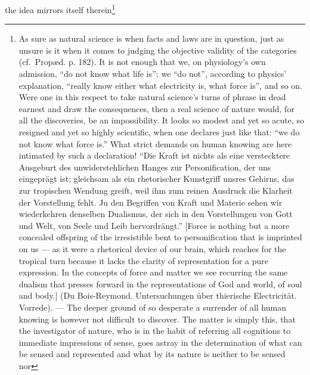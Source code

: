 \documentclass[12pt,a4paper]{book}
\begin{document}
the idea mirrors itself therein\footnote{As sure as natural science is when facts
and laws are in question, just as unsure is it when it comes to judging the
objective validity of the categories (cf.\ Propæd. p. 182).
It is not enough that we, on physiology's own admission, ``do not know what life
is''; we ``do not'', according to physics' explanation, ``really know either what
electricity is, what force is'', and so on. Were one in this respect to take
natural science's turns of phrase in dead earnest and draw the consequences, then
a real science of nature would, for all the discoveries, be an impossibility. It
looks so modest and yet so acute, so resigned and yet so highly scientific, when
one declares just like that: ``we do not know what force is.'' What strict demands
on human knowing are here intimated by such a declaration! ``Die Kraft ist nichts
als eine verstecktere Ausgeburt des unwiderstehlichen Hanges zur Personification,
der uns eingeprägt ist; gleichsam als ein rhetorischer Kunstgriff unsres Gehirns,
das zur tropischen Wendung greift, weil ihm zum reinen Ausdruck die Klarheit der
Vorstellung fehlt. Ju den Begriffen von Kraft und Materie sehen wir wiederkehren
denselben Dualismus, der sich in den Vorstellungen von Gott und Welt, von Seele
und Leib hervordrängt.'' [Force is nothing but a more concealed offspring of the
irresistible bent to personification that is imprinted on us --- as it were a
rhetorical device of our brain, which reaches for the tropical turn because it
lacks the clarity of representation for a pure expression. In the concepts of
force and matter we see recurring the same dualism that presses forward in the
representations of God and world, of soul and body.] (Du Bois-Reymond.
Untersuchungen über thierische Electricität. Vorrede). ---
The deeper ground of so desperate a surrender of all human knowing is however not
difficult to discover. The matter is simply this, that the investigator of nature,
who is in the habit of referring all cognitions to
immediate impressions of sense, goes astray in the determination of what can be
sensed and represented and what by its nature is neither to be sensed nor
}
\end{document}
